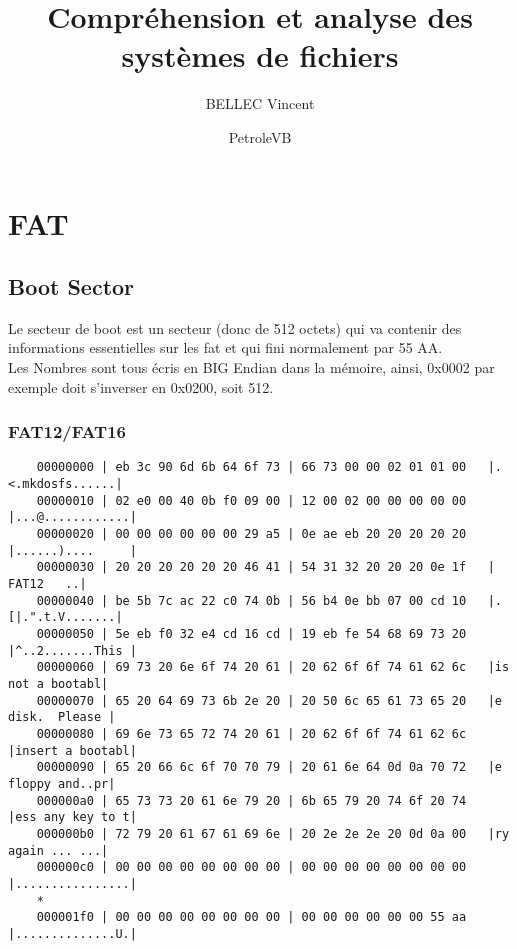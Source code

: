 \documentclass[11pt]{report}
\title{Compréhension et analyse des systèmes de fichiers}
\author{BELLEC Vincent \and PetroleVB}
\begin{document}
	
	\maketitle
	\tableofcontents

\chapter{FAT}

\section{Boot Sector}

Le secteur de boot est  un secteur (donc de 512 octets) qui va contenir des informations essentielles sur les fat et qui fini normalement par 55 AA.\\
Les Nombres sont tous écris en BIG Endian dans la mémoire, ainsi, 0x0002 par exemple doit s'inverser en 0x0200, soit 512.\\
\subsection{FAT12/FAT16}

\begin{verbatim}
	00000000 | eb 3c 90 6d 6b 64 6f 73 | 66 73 00 00 02 01 01 00   |.<.mkdosfs......| 
	00000010 | 02 e0 00 40 0b f0 09 00 | 12 00 02 00 00 00 00 00   |...@............| 
	00000020 | 00 00 00 00 00 00 29 a5 | 0e ae eb 20 20 20 20 20   |......)....     | 
	00000030 | 20 20 20 20 20 20 46 41 | 54 31 32 20 20 20 0e 1f   |      FAT12   ..| 
	00000040 | be 5b 7c ac 22 c0 74 0b | 56 b4 0e bb 07 00 cd 10   |.[|.".t.V.......| 
	00000050 | 5e eb f0 32 e4 cd 16 cd | 19 eb fe 54 68 69 73 20   |^..2.......This | 
	00000060 | 69 73 20 6e 6f 74 20 61 | 20 62 6f 6f 74 61 62 6c   |is not a bootabl| 
	00000070 | 65 20 64 69 73 6b 2e 20 | 20 50 6c 65 61 73 65 20   |e disk.  Please |
	00000080 | 69 6e 73 65 72 74 20 61 | 20 62 6f 6f 74 61 62 6c   |insert a bootabl| 
	00000090 | 65 20 66 6c 6f 70 70 79 | 20 61 6e 64 0d 0a 70 72   |e floppy and..pr| 
	000000a0 | 65 73 73 20 61 6e 79 20 | 6b 65 79 20 74 6f 20 74   |ess any key to t| 
	000000b0 | 72 79 20 61 67 61 69 6e | 20 2e 2e 2e 20 0d 0a 00   |ry again ... ...| 
	000000c0 | 00 00 00 00 00 00 00 00 | 00 00 00 00 00 00 00 00   |................| 
	*
	000001f0 | 00 00 00 00 00 00 00 00 | 00 00 00 00 00 00 55 aa   |..............U.| 
\end{verbatim}
\newpage
\end{document}

